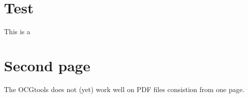 \documentclass{scrartcl}
\begin{document}
\section{Test}
This is a 

\newpage
\section{Second page}
The OCGtools does not (yet) work well on PDF files consistion from one page.
\end{document}
